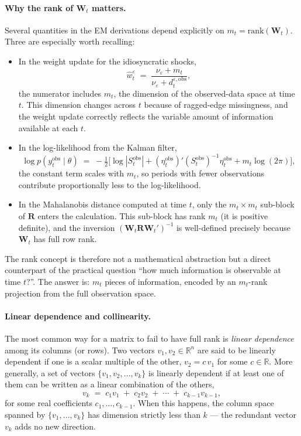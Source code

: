 \documentclass[11pt, a4paper, oneside]{article}
\begin{document}
\paragraph{Why the rank of $\mathbf{W}_t$ matters.}
Several quantities in the EM derivations depend explicitly on
$m_t = \mathrm{rank}(\mathbf{W}_t)$. Three are especially worth
recalling:
\begin{itemize}[leftmargin=1.5em, itemsep=3pt]
    \item In the weight update for the idiosyncratic shocks,
          \[
          \hat{w}^\varepsilon_t \;=\; \frac{\nu_\varepsilon + m_t}{\nu_\varepsilon + d^{\varepsilon, \mathrm{obs}}_t},
          \]
          the numerator includes $m_t$, the dimension of the
          observed-data space at time $t$. This dimension changes
          across $t$ because of ragged-edge missingness, and the
          weight update correctly reflects the variable amount of
          information available at each $t$.
    \item In the log-likelihood from the Kalman filter,
          \[
          \log p(y_t^{\mathrm{obs}} \mid \theta) \;=\; -\tfrac{1}{2}\big[\log|S_t^{\mathrm{obs}}| + (\eta_t^{\mathrm{obs}})'(S_t^{\mathrm{obs}})^{-1} \eta_t^{\mathrm{obs}} + m_t \log(2\pi)\big],
          \]
          the constant term scales with $m_t$, so periods with fewer
          observations contribute proportionally less to the
          log-likelihood.
    \item In the Mahalanobis distance computed at time $t$, only the
          $m_t \times m_t$ sub-block of $\mathbf{R}$ enters the
          calculation. This sub-block has rank $m_t$ (it is positive
          definite), and the inversion $(\mathbf{W}_t \mathbf{R} \mathbf{W}_t')^{-1}$
          is well-defined precisely because $\mathbf{W}_t$ has full
          row rank.
\end{itemize}
The rank concept is therefore not a mathematical abstraction but a
direct counterpart of the practical question ``how much information
is observable at time $t$?''. The answer is: $m_t$ pieces of
information, encoded by an $m_t$-rank projection from the full
observation space.

\paragraph{Linear dependence and collinearity.}
The most common way for a matrix to fail to have full rank is
\emph{linear dependence} among its columns (or rows). Two vectors
$v_1, v_2 \in \mathbb{R}^n$ are said to be linearly dependent if one
is a scalar multiple of the other, $v_2 = c\, v_1$ for some
$c \in \mathbb{R}$. More generally, a set of vectors
$\{v_1, v_2, \ldots, v_k\}$ is linearly dependent if at least one of
them can be written as a linear combination of the others,
\[
v_k \;=\; c_1 v_1 \;+\; c_2 v_2 \;+\; \cdots \;+\; c_{k-1} v_{k-1},
\]
for some real coefficients $c_1, \ldots, c_{k-1}$. When this happens,
the column space spanned by $\{v_1, \ldots, v_k\}$ has dimension
strictly less than $k$ — the redundant vector $v_k$ adds no new
direction.
\end{document}
